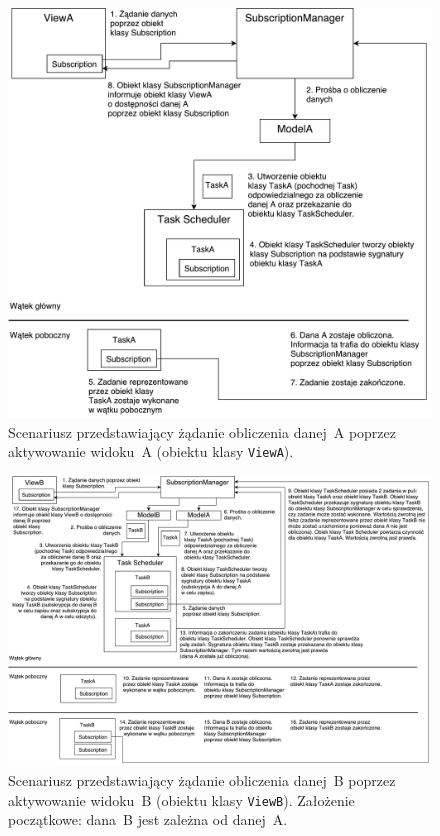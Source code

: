 \begin{landscape}

	\begin{figure}[ht]
		\centering
		\includegraphics[width=0.6\linewidth]{rys05/scenario_1}
		\caption{Scenariusz przedstawiający żądanie obliczenia danej~A poprzez aktywowanie widoku~A (obiektu klasy \lstinline$ViewA$).}
		\label{fig:scenario1}	
	\end{figure}

	\begin{figure}[ht]
		\centering
		\includegraphics[width=0.8\linewidth]{rys05/scenario_2}
		\caption{Scenariusz przedstawiający żądanie obliczenia danej~B poprzez aktywowanie widoku~B (obiektu klasy \lstinline$ViewB$). Założenie początkowe: dana~B jest zależna od danej~A.}
		\label{fig:scenario2}	
	\end{figure}
	

\end{landscape}
